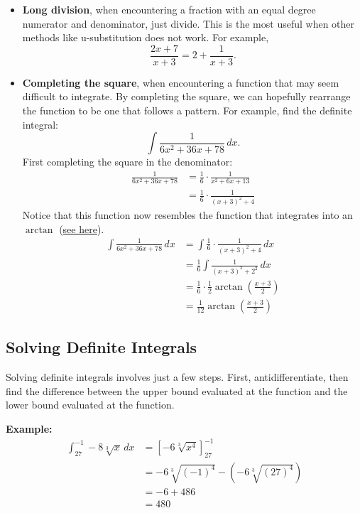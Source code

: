 \documentclass[12pt]{article}
\begin{document}
\begin{itemize}
    \item \textbf{Long division}, when encountering a fraction with an equal degree numerator and denominator, just divide. This is the most useful when other methods like u-substitution does not work. For example,
          \[ \frac{2x+7}{x+3} = 2 + \frac{1}{x+3}. \]

    \item \textbf{Completing the square}, when encountering a function that may seem difficult to integrate. By completing the square, we can hopefully rearrange the function to be one that follows a pattern. For example, find the definite integral:
          \[ \int \frac{1}{6x^2+36x+78} \, dx. \]
          First completing the square in the denominator:
          \begin{align*}
              \frac{1}{6x^2+36x+78} & = \frac{1}{6} \cdot \frac{1}{x^2+6x+13}   \\[6pt]
                                    & = \frac{1}{6} \cdot \frac{1}{(x+3)^2 + 4}
          \end{align*}
          Notice that this function now resembles the function that integrates into an $\arctan$ (\hyperref[sec:arctanintegral]{see here}).
          \begin{align*}
              \int \frac{1}{6x^2+36x+78} \, dx & = \int \frac{1}{6} \cdot \frac{1}{(x+3)^2 + 4} \, dx                 \\[6pt]
                                               & = \frac{1}{6} \int \frac{1}{(x+3)^2 + 2^2} \, dx                     \\[6pt]
                                               & = \frac{1}{6} \cdot \frac{1}{2} \arctan \left( \frac{x+3}{2} \right) \\[6pt]
                                               & = \frac{1}{12} \arctan \left( \frac{x+3}{2} \right)
          \end{align*}
\end{itemize}

\subsection{Solving Definite Integrals}
Solving definite integrals involves just a few steps. First, antidifferentiate, then find the difference between the upper bound evaluated at the function and the lower bound evaluated at the function.

\noindent \textbf{Example:}
\begin{align*}
    \int_{27}^{-1} -8 \sqrt[3]{x} \, dx & = \left[ -6 \sqrt[3]{x^4} \right]_{27}^{-1}                \\
                                        & = -6 \sqrt[3]{(-1)^4} - \left( -6 \sqrt[3]{(27)^4} \right) \\
                                        & = -6 + 486                                                 \\
                                        & = 480
\end{align*}
\end{document}
